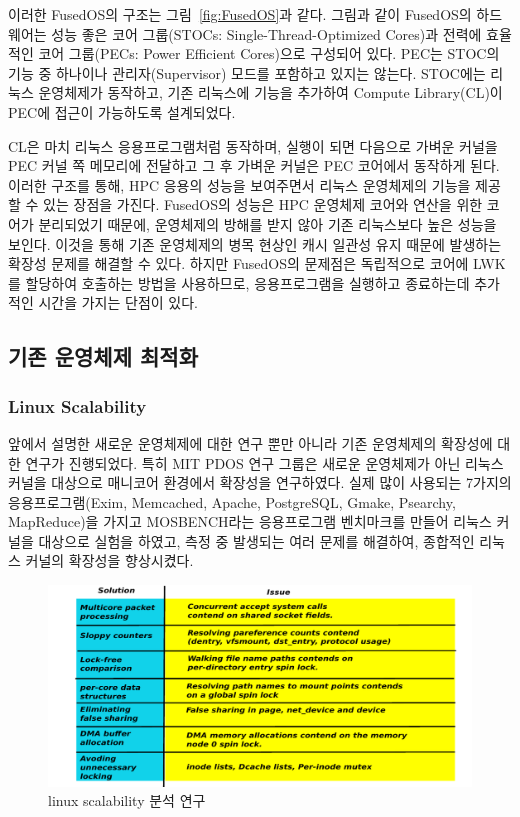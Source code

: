 이러한 FusedOS의 구조는 그림~\ref{fig:FusedOS}과 같다. 
그림과 같이 FusedOS의 하드웨어는 성능 좋은 코어 그룹(STOCs: Single-Thread-Optimized Cores)과
전력에 효율적인 코어 그룹(PECs: Power Efficient Cores)으로 구성되어 있다.
PEC는 STOC의 기능 중 하나이나 관리자(Supervisor) 모드를 포함하고 있지는 않는다. 
STOC에는 리눅스 운영체제가 동작하고, 기존 리눅스에 기능을 추가하여 Compute Library(CL)이 PEC에 
접근이 가능하도록 설계되었다.

CL은 마치 리눅스 응용프로그램처럼 동작하며, 실행이 되면 다음으로 가벼운 커널을 PEC 커널 쪽 메모리에 
전달하고 그 후 가벼운 커널은 PEC 코어에서 동작하게 된다.
이러한 구조를 통해, HPC 응용의 성능을 보여주면서 리눅스 운영체제의 기능을 제공할 수 있는 장점을 가진다. 
FusedOS의 성능은 HPC 운영체제 코어와 연산을 위한 코어가 분리되었기 때문에, 운영체제의 
방해를 받지 않아 기존 리눅스보다 높은 성능을 보인다.
이것을 통해 기존 운영체제의 병목 현상인 캐시 일관성 유지 때문에 발생하는 확장성 문제를 해결할 수 있다.
하지만 FusedOS의 문제점은 독립적으로 코어에 LWK를 할당하여 호출하는 방법을 사용하므로,  
응용프로그램을 실행하고 종료하는데 추가적인 시간을 가지는 단점이 있다.

\subsection{기존 운영체제 최적화}

\subsubsection{Linux Scalability}

앞에서 설명한 새로운 운영체제에 대한 연구 뿐만 아니라 기존 운영체제의 확장성에 대한 연구가 진행되었다. 
특히 MIT PDOS 연구 그룹은 새로운 운영체제가 아닌 리눅스 커널을 대상으로 매니코어 환경에서 확장성을 연구하였다.
실제 많이 사용되는 7가지의 응용프로그램(Exim, Memcached, Apache, PostgreSQL, Gmake, Psearchy,
MapReduce)을 가지고 MOSBENCH라는 응용프로그램 벤치마크를 만들어 리눅스 커널을 대상으로 실험을 
하였고, 측정 중 발생되는 여러 문제를 해결하여, 종합적인 리눅스 커널의 확장성을 향상시켰다.

\begin{figure}[h!]
    \centering
    \includegraphics[width=1\textwidth]{fig/linux/linux}
    \caption{linux scalability 분석 연구}
  \label{fig:linux}
\end{figure}

